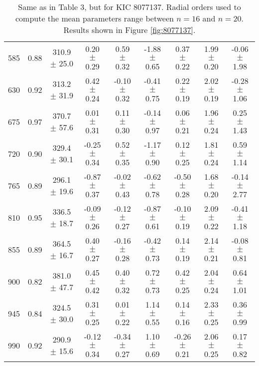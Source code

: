 \documentclass[twocolumn]{aastex61}%
\begin{document}
\begin{table*}[ht]
\begin{tabular}{ccc|ccccc|c}
585 & 0.88 & 310.9 $\pm$ 25.0 & 0.20 $\pm$ 0.29 & 0.59 $\pm$ 0.32 & -1.88 $\pm$ 0.65 & 0.37 $\pm$ 0.22 & 1.99 $\pm$ 0.20 & -0.06 $\pm$ 1.98\\
630 & 0.92 & 313.2 $\pm$ 31.9 & 0.42 $\pm$ 0.24 & -0.10 $\pm$ 0.32 & -0.41 $\pm$ 0.75 & 0.22 $\pm$ 0.19 & 2.02 $\pm$ 0.19 & -0.28 $\pm$ 1.06\\
675 & 0.97 & 370.7 $\pm$ 57.6 & 0.01 $\pm$ 0.31 & 0.11 $\pm$ 0.30 & -0.14 $\pm$ 0.97 & 0.06 $\pm$ 0.21 & 1.96 $\pm$ 0.24 & 0.25 $\pm$ 1.43\\
720 & 0.90 & 329.4 $\pm$ 30.1 & -0.25 $\pm$ 0.34 & 0.52 $\pm$ 0.35 & -1.17 $\pm$ 0.90 & 0.12 $\pm$ 0.25 & 1.81 $\pm$ 0.24 & 0.59 $\pm$ 1.14\\
765 & 0.89 & 296.1 $\pm$ 19.6 & -0.87 $\pm$ 0.37 & -0.02 $\pm$ 0.43 & -0.62 $\pm$ 0.78 & -0.50 $\pm$ 0.28 & 1.68 $\pm$ 0.20 & -0.14 $\pm$ 2.77\\
810 & 0.95 & 336.5 $\pm$ 18.7 & -0.09 $\pm$ 0.26 & -0.12 $\pm$ 0.27 & -0.87 $\pm$ 0.61 & -0.10 $\pm$ 0.19 & 2.09 $\pm$ 0.22 & -0.41 $\pm$ 1.18\\
855 & 0.89 & 364.5 $\pm$ 16.7 & 0.40 $\pm$ 0.27 & -0.16 $\pm$ 0.28 & -0.42 $\pm$ 0.73 & 0.14 $\pm$ 0.19 & 2.14 $\pm$ 0.21 & -0.08 $\pm$ 0.81\\
900 & 0.82 & 381.0 $\pm$ 47.7 & 0.45 $\pm$ 0.42 & 0.40 $\pm$ 0.32 & 0.72 $\pm$ 0.73 & 0.42 $\pm$ 0.25 & 2.04 $\pm$ 0.24 & 0.64 $\pm$ 1.01\\
945 & 0.84 & 324.5 $\pm$ 30.0 & 0.31 $\pm$ 0.25 & 0.01 $\pm$ 0.22 & 1.14 $\pm$ 0.55 & 0.14 $\pm$ 0.16 & 2.33 $\pm$ 0.25 & 0.36 $\pm$ 0.99\\
990 & 0.92 & 290.9 $\pm$ 15.6 & -0.12 $\pm$ 0.34 & -0.34 $\pm$ 0.27 & 1.10 $\pm$ 0.69 & -0.26 $\pm$ 0.21 & 2.06 $\pm$ 0.25 & 0.17 $\pm$ 0.82\\
\end{tabular}
\caption{Same as in Table 3, but for KIC 8077137. Radial orders used to compute the mean parameters range between $n=16$ and $n=20$. Results shown in Figure \ref{fig:8077137}.}\label{tab:8077137}
\end{table*}
\end{document}
